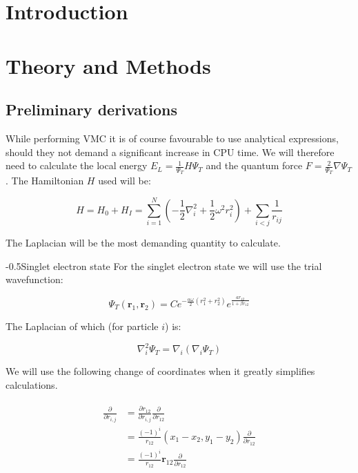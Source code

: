 \documentclass[english, a4paper]{article}
\makeatletter
\renewcommand{\subsubsection}{\@startsection{subsubsection}{3}{0pt}%
{-\baselineskip}{0.5\baselineskip}{\bf\large}}
\newcommand{\bm}[1]{\mathbf{#1}}
\makeatother
\begin{document}
\section{Introduction}


\section{Theory and Methods}
\subsection{Preliminary derivations}
While performing VMC it is of course favourable to use analytical expressions, should they not demand a significant increase in CPU time. We will therefore need to calculate the local energy $E_L = \frac{1}{\Psi_T}H\Psi_T$ and the quantum force $F = \frac{2}{\Psi_T}\nabla\Psi_T$. The Hamiltonian $H$ used will be:

\begin{equation}
	H = H_0 + H_I = \sum_{i=1}^{N}\left(-\frac{1}{2}\nabla_i^2 + \frac{1}{2}\omega^2r_i^2\right) + \sum_{i<j}\frac{1}{r_{ij}}
\end{equation}

The Laplacian will be the most demanding quantity to calculate.

\subsubsection{Singlet electron state}
For the singlet electron state we will use the trial wavefunction:

\begin{equation}
	\Psi_T(\bm{r}_1,\bm{r}_2) = Ce^{-\frac{\alpha\omega}{2}(r_1^2+r_2^2)}e^{\frac{ar_{12}}{1+\beta r_{12}}}
\end{equation}

The Laplacian of which (for particle $i$) is:

\begin{equation}
	\nabla_i^2 \Psi_T = \nabla_i(\nabla_i\Psi_T)
\end{equation}

We will use the following change of coordinates when it greatly simplifies calculations.

\begin{align}
	\begin{split}
	\frac{\partial}{\partial r_{i,j}} &= \frac{\partial r_{12}}{\partial r_{i,j}}\frac{\partial}{\partial r_{12}}\\
	&= \frac{(-1)^i}{r_{12}}(x_1-x_2, y_1-y_2)\frac{\partial}{\partial r_{12}}\\
	&= \frac{(-1)^i}{r_{12}}\bm{r}_{12}\frac{\partial}{\partial r_{12}}
	\end{split}
\end{align}
\end{document}
